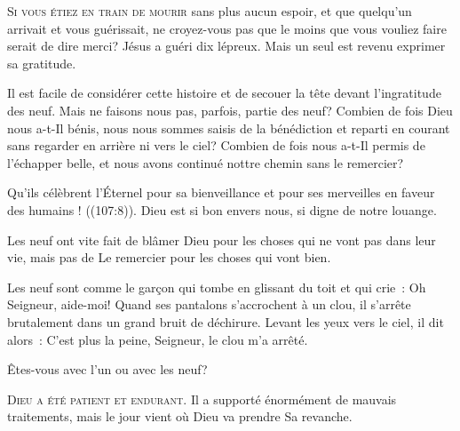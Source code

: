 \lettrine{S}{i vous étiez en train de mourir} sans plus aucun espoir,
 et que quelqu'un arrivait et vous guérissait, ne croyez-vous pas
 que le moins que vous vouliez faire serait de dire merci?
 Jésus a guéri dix lépreux. Mais un seul est revenu exprimer sa gratitude.

Il est facile de considérer cette histoire et de secouer la tête
 devant l'ingratitude des neuf. Mais ne faisons nous pas, parfois,
 partie des neuf? Combien de fois Dieu nous a-t-Il bénis,
 nous nous sommes saisis de la bénédiction et 
 reparti en courant sans regarder en arrière ni vers le ciel?
 Combien de fois nous a-t-Il permis de l'échapper belle,
 et nous avons continué nottre chemin sans le remercier?


\og Qu'ils célèbrent l'Éternel pour sa bienveillance
 et pour ses merveilles en faveur des humains ! \fg{}
 ((107:8)).
 Dieu est si bon envers nous, si digne de notre louange.

Les neuf ont vite fait de blâmer Dieu pour les choses qui ne vont pas
 dans leur vie, mais pas de Le remercier pour les choses qui vont bien.

Les neuf sont comme le garçon qui tombe en glissant du toit
 et qui crie~: 
 \og Oh Seigneur, aide-moi! \fg{} Quand ses pantalons s'accrochent à un clou,
 il s'arrête brutalement dans un grand bruit de déchirure.
 Levant les yeux vers le ciel, il dit alors~: 
 \og C'est plus la peine, Seigneur, le clou m'a arrêté. \fg{}

Êtes-vous avec l'un ou avec les neuf?

\dvrule






\lettrine{D}{ieu a été patient et endurant.}
 Il a supporté énormément de mauvais traitements,
 mais le jour vient où Dieu va prendre Sa revanche.

